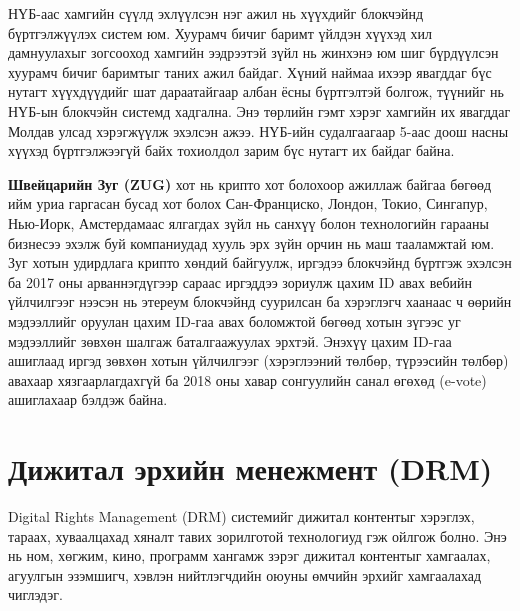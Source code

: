НҮБ-аас хамгийн сүүлд эхлүүлсэн нэг ажил нь хүүхдийг блокчэйнд
бүртгэлжүүлэх систем юм. Хуурамч бичиг баримт үйлдэн хүүхэд хил
дамнуулахыг зогсооход хамгийн ээдрээтэй зүйл нь жинхэнэ юм шиг
бүрдүүлсэн хуурамч бичиг баримтыг таних ажил байдаг. Хүний наймаа ихээр явагддаг бүс нутагт хүүхдүүдийг шат дараатайгаар албан ёсны бүртгэлтэй болгож, түүнийг нь НҮБ-ын блокчэйн системд хадгална. Энэ төрлийн гэмт хэрэг хамгийн их явагддаг Молдав улсад хэрэгжүүлж эхэлсэн ажээ. НҮБ-ийн судалгаагаар 5-аас доош насны хүүхэд бүртгэлжээгүй байх тохиолдол зарим
бүс нутагт их байдаг байна.

\textbf{Швейцарийн Зуг (ZUG)} хот нь крипто хот болохоор ажиллаж
байгаа бөгөөд ийм уриа гаргасан бусад хот болох Сан-Франциско, Лондон, Токио, Сингапур, Нью-Иорк, Амстердамаас ялгагдах зүйл нь санхүү болон технологийн гарааны бизнесээ эхэлж буй компаниудад хууль эрх зүйн орчин нь маш тааламжтай юм. Зуг хотын удирдлага крипто хөндий байгуулж, иргэдээ блокчэйнд бүртгэж эхэлсэн ба 2017 оны арваннэгдүгээр сараас иргэддээ зориулж цахим ID авах вебийн үйлчилгээг нээсэн нь этереум
блокчэйнд суурилсан ба хэрэглэгч хаанаас ч өөрийн мэдээллийг оруулан цахим ID-гаа авах боломжтой бөгөөд хотын зүгээс уг мэдээллийг зөвхөн шалгаж баталгаажуулах эрхтэй. Энэхүү цахим ID-гаа ашиглаад иргэд зөвхөн хотын үйлчилгээг (хэрэглээний төлбөр, түрээсийн төлбөр) авахаар хязгаарлагдахгүй ба 2018 оны хавар сонгуулийн санал өгөхөд (e-vote) ашиглахаар бэлдэж байна.

\section{Дижитал эрхийн менежмент (DRM)}
Digital Rights Management (DRM) системийг дижитал контентыг хэрэглэх, тараах, хуваалцахад хяналт тавих зорилготой технологиуд гэж ойлгож болно. Энэ нь ном, хөгжим, кино, программ хангамж зэрэг дижитал контентыг хамгаалах, агуулгын эзэмшигч, хэвлэн нийтлэгчдийн оюуны өмчийн эрхийг хамгаалахад чиглэдэг.

